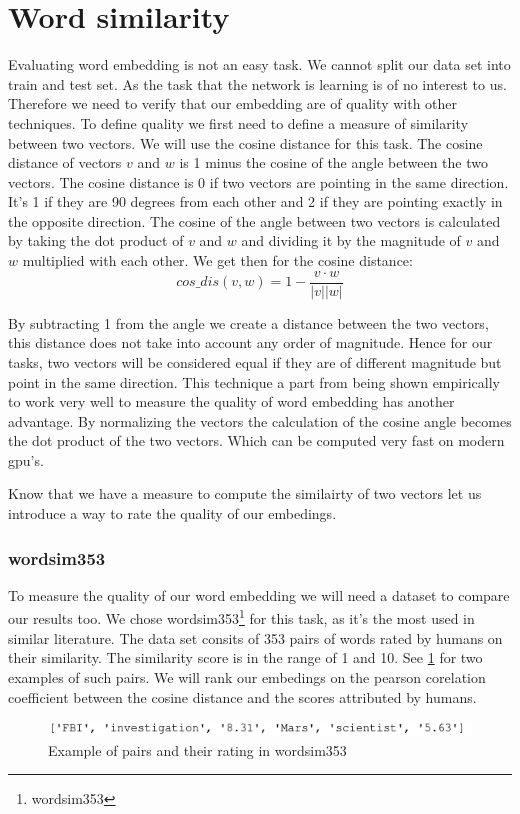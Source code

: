 \section{Word similarity}
Evaluating word embedding is not an easy task. We cannot split our data set into train and test set. As the task that the network is learning is of no interest to us. Therefore we need to verify that our embedding are of quality with other techniques. To define quality we first need to define a measure of similarity between two vectors. We will use the cosine distance for this task. The cosine distance of vectors $v$ and $w$ is 1 minus the cosine of the angle between the two vectors. The cosine distance is 0 if two vectors are pointing in the same direction. It's 1 if they are 90 degrees from each other and 2 if they are pointing exactly in the opposite direction. The cosine of the angle between two vectors is calculated by taking the dot product of $v$ and $w$ and dividing it by the magnitude of $v$ and $w$ multiplied with each other. We get then for the cosine distance:
\begin{equation}
cos\_dis(v,w) =1 - \frac{v \cdot w}{|v| |w|} 
\end{equation}

By subtracting 1 from the angle we create a distance between the two vectors, this distance does not take into account any order of magnitude.  Hence for our tasks, two vectors will be considered equal if they are of different magnitude but point in the same direction. 
This technique a part from being shown empirically to work very well to measure the quality of word embedding has another advantage. By normalizing the vectors the calculation of the cosine angle becomes the dot product of the two vectors. Which can be computed very fast on modern gpu's. 

Know that we have a measure to compute the similairty of two vectors let us introduce a way to rate the quality of our embedings.


\subsubsection{wordsim353}
To measure the quality of our word embedding we will need a dataset to compare our results too. We chose  wordsim353\footnote{wordsim353} for this task, as it's the most used in similar literature. The data set consits of 353 pairs of words rated by humans on their similarity. The similarity score is in the range of 1 and 10. See \ref{fig:ws353_ex} for two examples of such pairs. We will rank our embedings on the pearson corelation coefficient between the cosine distance and the scores attributed by humans. 
\begin{figure}[ht]
    \centering
			\includegraphics[scale=0.7]{images/wordsim353_example} 
    \caption{Example of pairs and their rating in wordsim353}
    \label{fig:ws353_ex}
\end{figure}

